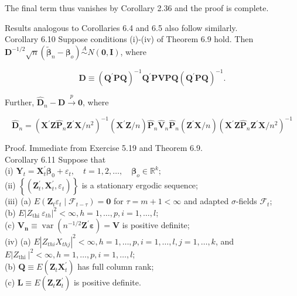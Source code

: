 \documentclass[10pt]{article}
\begin{document}
The final term thus vanishes by Corollary 2.36 and the proof is complete.

Results analogous to Corollaries 6.4 and 6.5 also follow similarly.\\
Corollary 6.10 Suppose conditions (i)-(iv) of Theorem 6.9 hold. Then $\mathbf{D}^{-1 / 2} \sqrt{n}\left(\tilde{\boldsymbol{\beta}}_{n}-\boldsymbol{\beta}_{o}\right) \stackrel{A}{\sim} N(\mathbf{0}, \mathbf{I})$, where

$$
\mathbf{D} \equiv\left(\mathbf{Q}^{\prime} \mathbf{P Q}\right)^{-1} \mathbf{Q}^{\prime} \mathbf{P} \mathbf{V P Q}\left(\mathbf{Q}^{\prime} \mathbf{P Q}\right)^{-1} .
$$

Further, $\hat{\mathbf{D}}_{n}-\mathbf{D} \xrightarrow{p} \mathbf{0}$, where

$$
\hat{\mathbf{D}}_{n}=\left(\mathbf{X}^{\prime} \mathbf{Z} \hat{\mathbf{P}}_{n} \mathbf{Z}^{\prime} \mathbf{X} / n^{2}\right)^{-1}\left(\mathbf{X}^{\prime} \mathbf{Z} / n\right) \hat{\mathbf{P}}_{n} \hat{\mathbf{V}}_{n} \hat{\mathbf{P}}_{n}\left(\mathbf{Z}^{\prime} \mathbf{X} / n\right)\left(\mathbf{X}^{\prime} \mathbf{Z} \hat{\mathbf{P}}_{n} \mathbf{Z}^{\prime} \mathbf{X} / n^{2}\right)^{-1}
$$

Proof. Immediate from Exercise 5.19 and Theorem 6.9.\\
Corollary 6.11 Suppose that\\
(i) $\mathbf{Y}_{t}=\mathbf{X}_{t}^{\prime} \boldsymbol{\beta}_{0}+\varepsilon_{t}, \quad t=1,2, \ldots, \quad \boldsymbol{\beta}_{o} \in \mathbb{R}^{k} ;$\\
(ii) $\left\{\left(\mathbf{Z}_{t}^{\prime}, \mathbf{X}_{t}^{\prime}, \varepsilon_{t}\right)\right\}$ is a stationary ergodic sequence;\\
(iii) (a) $E\left(\mathbf{Z}_{t} \varepsilon_{t} \mid \mathcal{F}_{t-\tau}\right)=\mathbf{0}$ for $\tau=m+1<\infty$ and adapted $\sigma$-fields $\mathcal{F}_{t}$;\\
(b) $E\left|Z_{\text {thi }} \varepsilon_{t h}\right|^{2}<\infty, h=1, \ldots, p, i=1, \ldots, l$;\\
(c) $\mathbf{V}_{\boldsymbol{n}} \equiv \operatorname{var}\left(n^{-1 / 2} \mathbf{Z}^{\prime} \boldsymbol{\varepsilon}\right)=\mathbf{V}$ is positive definite;\\
(iv) (a) $E\left|Z_{t h i} X_{t h j}\right|^{2}<\infty, h=1, \ldots, p, i=1, \ldots, l, j=1, \ldots, k$, and $E\left|Z_{\text {thi }}\right|^{2}<\infty, h=1, \ldots, p, i=1, \ldots, l$;\\
(b) $\mathbf{Q} \equiv E\left(\mathbf{Z}_{t} \mathbf{X}_{t}^{\prime}\right)$ has full column rank;\\
(c) $\mathbf{L} \equiv E\left(\mathbf{Z}_{t} \mathbf{Z}_{t}^{\prime}\right)$ is positive definite.
\end{document}
